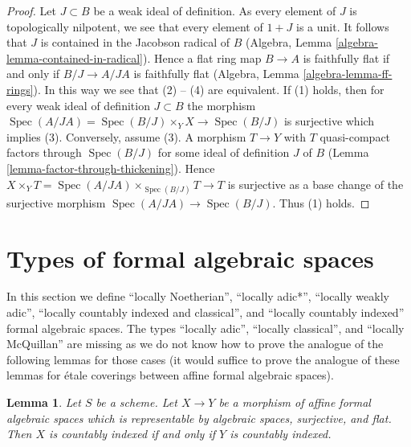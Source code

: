 \documentclass{stacks-project}
\theoremstyle{plain}
\newtheorem{lemma}[subsection]{Lemma}
\theoremstyle{definition}
\theoremstyle{remark}
\numberwithin{equation}{subsection}
\def\Spec{\mathop{\mathrm{Spec}}}
\begin{document}
\begin{proof}
Let $J \subset B$ be a weak ideal of definition. As every element of $J$
is topologically nilpotent, we see that every element of $1 + J$ is
a unit. It follows that $J$ is contained in the Jacobson radical of $B$
(Algebra, Lemma \ref{algebra-lemma-contained-in-radical}).
Hence a flat ring map $B \to A$ is faithfully flat if and only if
$B/J \to A/JA$ is faithfully flat
(Algebra, Lemma \ref{algebra-lemma-ff-rings}).
In this way we see that (2) -- (4) are equivalent.
If (1) holds, then for every weak ideal of definition $J \subset B$
the morphism
$\Spec(A/JA) = \Spec(B/J) \times_Y X \to \Spec(B/J)$ is surjective
which implies (3). Conversely, assume (3).
A morphism $T \to Y$ with $T$ quasi-compact
factors through $\Spec(B/J)$ for some ideal of definition $J$ of $B$
(Lemma \ref{lemma-factor-through-thickening}).
Hence $X \times_Y T = \Spec(A/JA) \times_{\Spec(B/J)} T \to T$
is surjective as a base change of the surjective morphism
$\Spec(A/JA) \to \Spec(B/J)$. Thus (1) holds.
\end{proof}





\section{Types of formal algebraic spaces}
\label{section-types}

\noindent
In this section we define
``locally Noetherian'',
``locally adic*'',
``locally weakly adic'',
``locally countably indexed and classical'', and
``locally countably indexed''
formal algebraic spaces. The types
``locally adic'',
``locally classical'', and
``locally McQuillan''
are missing as we do not know how to prove the analogue of the following
lemmas for those cases (it would suffice to prove the analogue of these
lemmas for \'etale coverings between affine formal algebraic spaces).

\begin{lemma}
\label{lemma-iff-countably-indexed}
Let $S$ be a scheme. Let $X \to Y$ be a morphism of affine
formal algebraic spaces which is representable by algebraic spaces,
surjective, and flat. Then $X$ is countably indexed if and only
if $Y$ is countably indexed.
\end{lemma}
\end{document}
